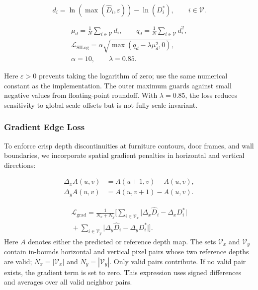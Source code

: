 \documentclass[twoside,final]{hcmut-report}
\begin{document}
\begin{equation}
d_i=\ln\!\left(\max(\hat{D}_i,\varepsilon)\right)
-\ln(D_i^*),\qquad i\in\mathcal{V}.
\end{equation}

\begin{equation}
\begin{gathered}
\mu_d=\frac{1}{N}\sum_{i\in\mathcal{V}}d_i,
\qquad q_d=\frac{1}{N}\sum_{i\in\mathcal{V}}d_i^2,\\
\mathcal{L}_{\mathrm{SILog}}
=\alpha\sqrt{\max(q_d-\lambda\mu_d^2,0)},\\
\alpha=10,\qquad\lambda=0.85.
\end{gathered}
\end{equation}

Here $\varepsilon>0$ prevents taking the logarithm of zero; use the same numerical constant as the implementation. The outer maximum guards against small negative values from floating-point roundoff. With $\lambda=0.85$, the loss reduces sensitivity to global scale offsets but is not fully scale invariant.

\subsubsection{Gradient Edge Loss}

To enforce crisp depth discontinuities at furniture contours, door frames, and wall boundaries, we incorporate spatial gradient penalties in horizontal and vertical directions:

\begin{equation}
\begin{aligned}
\Delta_x A(u,v)&=A(u+1,v)-A(u,v),\\
\Delta_y A(u,v)&=A(u,v+1)-A(u,v).
\end{aligned}
\end{equation}

\begin{equation}
\begin{gathered}
\mathcal{L}_{\mathrm{grad}}=\frac{1}{N_x+N_y}\Biggl[
\sum_{i\in\mathcal{V}_x}
\bigl|\Delta_x\hat{D}_i-\Delta_xD_i^*\bigr|\\
{}+\sum_{i\in\mathcal{V}_y}
\bigl|\Delta_y\hat{D}_i-\Delta_yD_i^*\bigr|
\Biggr].
\end{gathered}
\end{equation}
Here $A$ denotes either the predicted or reference depth map. The sets $\mathcal{V}_x$ and $\mathcal{V}_y$ contain in-bounds horizontal and vertical pixel pairs whose two reference depths are valid; $N_x=|\mathcal{V}_x|$ and $N_y=|\mathcal{V}_y|$. Only valid pairs contribute. If no valid pair exists, the gradient term is set to zero. This expression uses signed differences and averages over all valid neighbor pairs.
\end{document}
